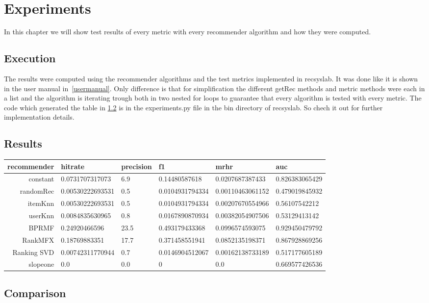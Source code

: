 \chapter{Experiments}
\label{experiments}
In this chapter we will show test results of every metric with every
recommender algorithm and how they were computed.


\section{Execution}
The results were computed using the recommender algorithms and 
the test metrics implemented in recsyslab. It was done 
like it is shown in the user manual in~\ref{usermanual}.
Only difference is that for simplification the different
getRec methods and metric methods were each in a list and the 
algorithm is iterating trough both in two nested for loops
to guarantee that every algorithm is tested with every metric.
The code which generated the table in \ref{results} is in 
the experiments.py file in the bin directory of recsyslab.
So chech it out for further implementation details.


\section{Results}
\label{results}
\begin{tabular}{rlllll} \toprule
    recommender  & hitrate & precision & f1 & mrhr & auc \\ \midrule
    constant & 0.0731707317073 & 6.9 & 0.14480587618 & 0.0207687387433 & 0.826383065429 \\
    randomRec & 0.00530222693531 & 0.5 & 0.0104931794334 & 0.00110463061152 & 0.479019845932 \\
    itemKnn & 0.00530222693531 & 0.5 & 0.0104931794334 & 0.00207670554966 & 0.56107542212 \\
    userKnn & 0.0084835630965 & 0.8 & 0.0167890870934 & 0.00382054907506 & 0.53129413142 \\
    BPRMF& 0.24920466596 & 23.5 & 0.493179433368 & 0.0996574593075 & 0.929450479792 \\
    RankMFX & 0.18769883351 & 17.7 & 0.371458551941 & 0.0852135198371 & 0.867928869256 \\
    Ranking SVD & 0.00742311770944 & 0.7 & 0.0146904512067 & 0.00162138733189 & 0.517177605189 \\
    slopeone & 0.0 & 0.0 & 0 & 0.0 & 0.669577426536 \\ \bottomrule
\end{tabular}

\section{Comparison}


